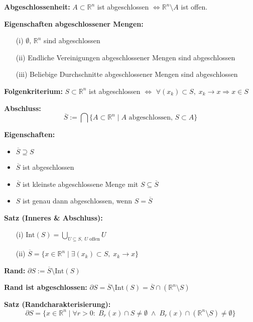 \textbf{Abgeschlossenheit:}  
\(A \subset \mathbb{R}^n\) ist abgeschlossen \(\Leftrightarrow \mathbb{R}^n \setminus A\) ist offen.

\textbf{Eigenschaften abgeschlossener Mengen:}
\begin{itemize}
  \item[(i)] \(\emptyset,\, \mathbb{R}^n\) sind abgeschlossen
  \item[(ii)] Endliche Vereinigungen abgeschlossener Mengen sind abgeschlossen
  \item[(iii)] Beliebige Durchschnitte abgeschlossener Mengen sind abgeschlossen
\end{itemize}

\textbf{Folgenkriterium:}  
\(S \subset \mathbb{R}^n\) ist abgeschlossen \(\Leftrightarrow\)  
\(\forall (x_k) \subset S,\; x_k \to x \Rightarrow x \in S\)

\textbf{Abschluss:}  
\[
\overline{S} := \bigcap \{A \subset \mathbb{R}^n \mid A \text{ abgeschlossen, } S \subset A\}
\]

\textbf{Eigenschaften:}
\begin{itemize}
  \item \(\overline{S} \supseteq S\)
  \item \(\overline{S}\) ist abgeschlossen
  \item \(\overline{S}\) ist kleinste abgeschlossene Menge mit \(S \subseteq \overline{S}\)
  \item \(S\) ist genau dann abgeschlossen, wenn \(S = \overline{S}\)
\end{itemize}

\textbf{Satz (Inneres \& Abschluss):}
\begin{itemize}
  \item[(i)] \(\displaystyle \text{Int}(S) = \bigcup_{U \subseteq S,\; U \text{ offen}} U\)
  \item[(ii)] \(\displaystyle \overline{S} = \{x \in \mathbb{R}^n \mid \exists (x_k) \subset S,\; x_k \to x\}\)
\end{itemize}

\textbf{Rand:}  
\(\partial S := \overline{S} \setminus \text{Int}(S)\)

\textbf{Rand ist abgeschlossen:}  
\(\partial S = \overline{S} \setminus \text{Int}(S) = \overline{S} \cap (\mathbb{R}^n \setminus S)\)

\textbf{Satz (Randcharakterisierung):}  
\[
\partial S = \{x \in \mathbb{R}^n \mid \forall r > 0:\; B_r(x) \cap S \ne \emptyset \;\land\; B_r(x) \cap (\mathbb{R}^n \setminus S) \ne \emptyset \}
\]


